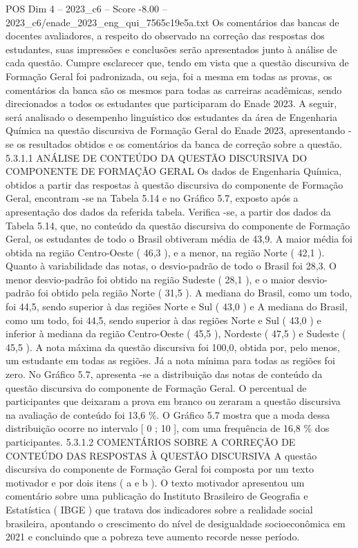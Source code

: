 \begin{textsample}{POS Dim 4 – 2023\_c6 – Score -8.00 – 2023\_c6/enade\_2023\_eng\_qui\_7565c19e5a.txt}
Os comentários das bancas de docentes avaliadores, a respeito do observado na correção das respostas dos estudantes, suas impressões e conclusões serão apresentados junto à análise de cada questão.
Cumpre esclarecer que, tendo em vista que a questão discursiva de Formação Geral foi padronizada, ou seja, foi a mesma em todas as provas, os comentários da banca são os mesmos para todas as carreiras acadêmicas, sendo direcionados a todos os estudantes que participaram do Enade 2023.
A seguir, será analisado o desempenho linguístico dos estudantes da área de Engenharia Química na questão discursiva de Formação Geral do Enade 2023, apresentando -se os resultados obtidos e os comentários da banca de correção sobre a questão. 5.3.1.1 ANÁLISE DE CONTEÚDO DA QUESTÃO DISCURSIVA DO COMPONENTE DE FORMAÇÃO GERAL Os dados de Engenharia Química, obtidos a partir das respostas à questão discursiva do componente de Formação Geral, encontram -se na Tabela 5.14 e no Gráfico 5.7, exposto após a apresentação dos dados da referida tabela.
Verifica -se, a partir dos dados da Tabela 5.14, que, no conteúdo da questão discursiva do componente de Formação Geral, os estudantes de todo o Brasil obtiveram média de 43,9.
A maior média foi obtida na região Centro-Oeste ( 46,3 ), e a menor, na região Norte ( 42,1 ).
Quanto à variabilidade das notas, o desvio-padrão de todo o Brasil foi 28,3.
O menor desvio-padrão foi obtido na região Sudeste ( 28,1 ), e o maior desvio-padrão foi obtido pela região Norte ( 31,5 ).
A mediana do Brasil, como um todo, foi 44,5, sendo superior à das regiões Norte e Sul ( 43,0 ) e A mediana do Brasil, como um todo, foi 44,5, sendo superior à das regiões Norte e Sul ( 43,0 ) e inferior à mediana da região Centro-Oeste ( 45,5 ), Nordeste ( 47,5 ) e Sudeste ( 45,5 ).
A nota máxima da questão discursiva foi 100,0, obtida por, pelo menos, um estudante em todas as regiões.
Já a nota mínima para todas as regiões foi zero.
No Gráfico 5.7, apresenta -se a distribuição das notas de conteúdo da questão discursiva do componente de Formação Geral.
O percentual de participantes que deixaram a prova em branco ou zeraram a questão discursiva na avaliação de conteúdo foi 13,6 \%.
O Gráfico 5.7 mostra que a moda dessa distribuição ocorre no intervalo [ 0 ; 10 ], com uma frequência de 16,8 \% dos participantes. 5.3.1.2 COMENTÁRIOS SOBRE A CORREÇÃO DE CONTEÚDO DAS RESPOSTAS À QUESTÃO DISCURSIVA A questão discursiva do componente de Formação Geral foi composta por um texto motivador e por dois itens ( a e b ).
O texto motivador apresentou um comentário sobre uma publicação do Instituto Brasileiro de Geografia e Estatística ( IBGE ) que tratava dos indicadores sobre a realidade social brasileira, apontando o crescimento do nível de desigualdade socioeconômica em 2021 e concluindo que a pobreza teve aumento recorde nesse período.

\end{textsample}
